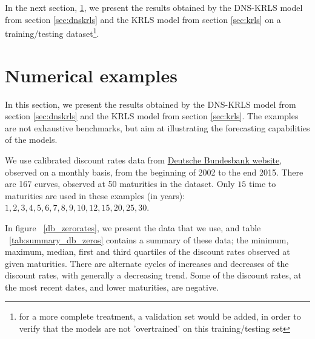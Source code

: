 In the next section, \ref{sec:numericalexamples}, we present the results obtained by the DNS-KRLS model from section \ref{sec:dnskrls} and the KRLS model from section \ref{sec:krls} on a training/testing dataset\footnote{for a more complete treatment, a validation set would be added, in order to verify that the models are not 'overtrained' on this training/testing set}.

\section{Numerical examples}
\label{sec:numericalexamples}

In this section, we present the results obtained by the DNS-KRLS model from section \ref{sec:dnskrls} and the KRLS model from section \ref{sec:krls}. The examples are not exhaustive benchmarks, but aim at illustrating the forecasting capabilities of the models. 

\medskip

We use calibrated discount rates data from \textcolor{blue}{\href{http://www.bundesbank.de/Navigation/EN/Statistics/Time_series_databases/time_series_databases.html}{Deutsche Bundesbank website}}, observed on a monthly basis, from the beginning of 2002 to the end 2015. There are 167 curves, observed at 50 maturities in the dataset. Only $15$ time to maturities are used in these examples (in years): $1, 2, 3, 4, 5, 6, 7, 8, 9, 10, 12, 15, 20, 25, 30$. 

\medskip

In figure ~\ref{db_zerorates}, we present the data that we use, and table ~\ref{tab:summary_db_zeros} contains a summary of these data; the minimum, maximum, median, first and third quartiles of the discount rates observed at given maturities. There are alternate cycles of increases and decreases of the discount rates, with generally a decreasing trend. Some of the discount rates, at the most recent dates, and lower maturities, are negative.


